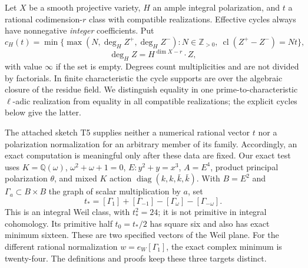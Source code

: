 \documentclass[11pt]{article}
\theoremstyle{remark}
\newcommand{\Q}{\mathbb Q}
\newcommand{\Z}{\mathbb Z}
\newcommand{\cl}{\operatorname{cl}}
\newcommand{\diag}{\operatorname{diag}}
\begin{document}
Let $X$ be a smooth projective variety, $H$ an ample integral polarization, and $t$ a rational codimension-$r$ class with compatible realizations. Effective cycles always have nonnegative \emph{integer} coefficients. Put
\[
c_H(t)=\min\bigl\{\max(N,\deg_H Z^+,\deg_H Z^-):
N\in\Z_{>0},\ \cl(Z^+-Z^-)=Nt\bigr\},
\]
\[
\deg_H Z=H^{\dim X-r}\cdot Z,
\]
with value $\infty$ if the set is empty. Degrees count multiplicities and are not divided by factorials. In finite characteristic the cycle supports are over the algebraic closure of the residue field. We distinguish equality in one prime-to-characteristic $\ell$-adic realization from equality in all compatible realizations; the explicit cycles below give the latter.

The attached sketch T5 supplies neither a numerical rational vector $t$ nor a polarization normalization for an arbitrary member of its family. Accordingly, an exact computation is meaningful only after these data are fixed. Our exact test uses $K=\Q(\omega)$, $\omega^2+\omega+1=0$, $E:y^2+y=x^3$, $A=E^4$, product principal polarization $\theta$, and mixed $K$ action $\diag(k,k,\bar k,\bar k)$. With $B=E^2$ and $\Gamma_a\subset B\times B$ the graph of scalar multiplication by $a$, set
\[
t_*=[\Gamma_1]+[\Gamma_{-1}]-[\Gamma_\omega]-[\Gamma_{-\omega}].
\]
This is an integral Weil class, with $t_*^2=24$; it is not primitive in integral cohomology. Its primitive half $t_0=t_*/2$ has square six and also has exact minimum sixteen. These are two specified vectors of the Weil plane. For the different rational normalization $w=e_W[\Gamma_1]$, the exact complex minimum is twenty-four. The definitions and proofs keep these three targets distinct.
\end{document}
